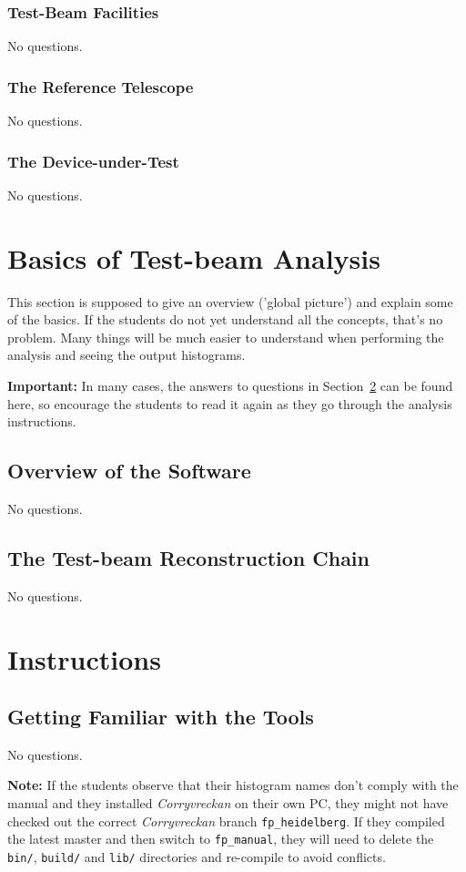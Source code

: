 \documentclass[a4paper,11pt]{article}
\newcommand*{\corry}{\emph{Corryvreckan}\xspace}
\newcommand*{\code}[1]{\texttt{#1}}
\begin{document}
\subsubsection{Test-Beam Facilities}
No questions.

\subsubsection{The Reference Telescope}
No questions.

\subsubsection{The Device-under-Test}
No questions.

\section{Basics of Test-beam Analysis}
This section is supposed to give an overview ('global picture') and explain some of the basics.
If the students do not yet understand all the concepts, that's no problem. 
Many things will be much easier to understand when performing the analysis and seeing the output histograms.

\textbf{Important:} In many cases, the answers to questions in Section~\ref{sec:instructions} can be found here, so encourage the students to read it again as they go through the analysis instructions.

\subsection{Overview of the Software}
No questions.

\subsection{The Test-beam Reconstruction Chain}
No questions.

\section{Instructions}
\label{sec:instructions}

\subsection{Getting Familiar with the Tools}
No questions.

\textbf{Note:} If the students observe that their histogram names don't comply with the manual and they installed \corry on their own PC, they might not have checked out the correct \corry branch \code{fp\_heidelberg}.
If they compiled the latest master and then switch to \code{fp\_manual}, they will need to delete the \code{bin/}, \code{build/} and \code{lib/} directories and re-compile to avoid conflicts.
\end{document}
